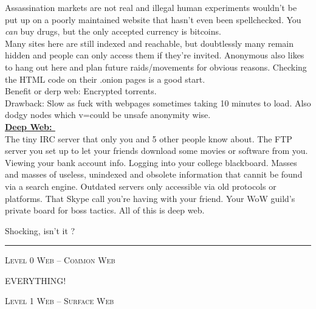 \documentclass[11pt,twoside,a4paper]{book}
\begin{document}
\noindent
Assassination markets are not real and illegal human experiments wouldn't be put up on a poorly maintained website that hasn't even been spellchecked. You \emph{can} buy drugs, but the only accepted currency is bitcoins.~\\

\noindent
Many sites here are still indexed and reachable, but doubtlessly many remain hidden and people can only access them if they're invited. Anonymous also likes to hang out here and plan future raids/movements for obvious reasons. Checking the HTML code on their .onion pages is a good start.~\\ 

\noindent
Benefit or derp web: Encrypted torrents.~\\
Drawback: Slow as fuck with webpages sometimes taking 10 minutes to load. Also dodgy nodes which v=could be unsafe anonymity wise.~\\

\noindent
\textbf{\underline{Deep Web: }}~\\

\noindent
The tiny IRC server that only you and 5 other people know about. The FTP server you set up to let your friends download some movies or software from you. Viewing your bank account info. Logging into your college blackboard. Masses and masses of useless, unindexed and obsolete information that cannit be found via a search engine. Outdated servers only accessible via old protocols or platforms. That Skype call you're having with your friend. Your WoW guild's private board for boss tactics. All of this is deep web.

\noindent
Shocking, isn't it ?

\begin{center} \rule{0.85\textwidth}{1mm} \end{center}

\clearpage

\noindent
\textsc{Level 0 Web -- Common Web}	\begin{huge} EVERYTHING! \end{huge}

\noindent
\textsc{Level 1 Web -- Surface Web}
\end{document}
